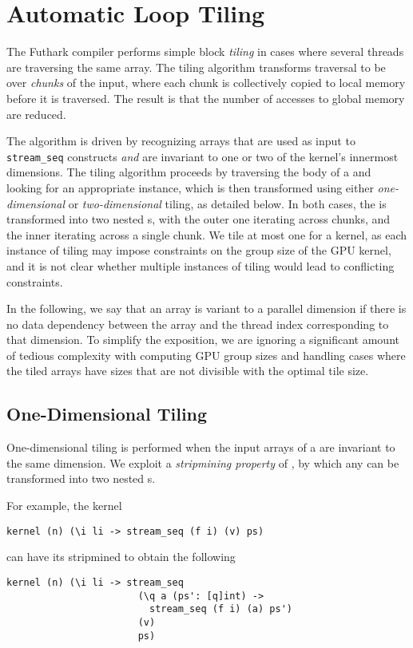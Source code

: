\section{Automatic Loop Tiling}
\label{sec:automatic-tiling}

The Futhark compiler performs simple block \textit{tiling} in cases
where several threads are traversing the same array.  The tiling
algorithm transforms traversal to be over \textit{chunks} of the
input, where each chunk is collectively copied to local memory before
it is traversed.  The result is that the number of accesses to global
memory are reduced.

The algorithm is driven by recognizing arrays that are used as input
to \lstinline{stream_seq} constructs \textit{and} are invariant to one
or two of the kernel's innermost dimensions.  The tiling algorithm
proceeds by traversing the body of a  and looking for an
appropriate \StreamSeq{} instance, which is then transformed using
either \textit{one-dimensional} or \textit{two-dimensional} tiling, as
detailed below.  In both cases, the \StreamSeq{} is transformed into
two nested \StreamSeq{}s, with the outer one iterating across chunks,
and the inner iterating across a single chunk.  We tile at most one
\StreamSeq{} for a kernel, as each instance of tiling may impose
constraints on the group size of the GPU kernel, and it is not clear
whether multiple instances of tiling would lead to conflicting
constraints.

In the following, we say that an array is variant to a parallel
dimension if there is no data dependency between the array and the
thread index corresponding to that dimension.  To simplify the
exposition, we are ignoring a significant amount of tedious complexity
with computing GPU group sizes and handling cases where the tiled
arrays have sizes that are not divisible with the optimal tile size.

\subsection{One-Dimensional Tiling}
\label{sec:one-dimensional-tiling}

One-dimensional tiling is performed when the input arrays of a
\StreamSeq{} are invariant to the same dimension.  We exploit a
\textit{stripmining property} of \StreamSeq{}, by which any
\StreamSeq{} can be transformed into two nested
\StreamSeq{}s.

For example, the kernel
\begin{lstlisting}
kernel (n) (\i li -> stream_seq (f i) (v) ps)
\end{lstlisting}
\noindent can have its \StreamSeq{} stripmined to obtain the following
\begin{lstlisting}
kernel (n) (\i li -> stream_seq
                       (\q a (ps': [q]int) ->
                         stream_seq (f i) (a) ps')
                       (v)
                       ps)
\end{lstlisting}

